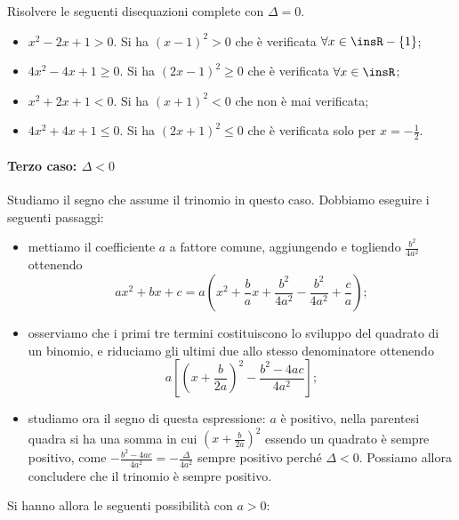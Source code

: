 \begin{exrig}
\begin{esempio}
Risolvere le seguenti disequazioni complete con $\Delta=0$.
\begin{itemize}
\item $x^2-2x+1>0$. Si ha $(x-1)^2>0$ che è verificata $\forall x\in \insR - \{1\}$;
\item $4x^2-4x+1\ge 0$. Si ha $(2x-1)^2\ge 0$ che è verificata $\forall x\in \insR$;
\item $x^2+2x+1<0$. Si ha $(x+1)^2<0$ che non è mai verificata;
\item $4x^2+4x+1\le 0$. Si ha $(2x+1)^2\le 0$ che è verificata solo per $x=-\frac 1 2$.
\end{itemize}
\end{esempio}
\end{exrig}

\paragraph{Terzo caso: $\Delta <0$} Studiamo il segno che assume il trinomio in questo caso. Dobbiamo eseguire i seguenti passaggi:

\begin{itemize}
\item mettiamo il coefficiente $a$ a fattore comune, aggiungendo e togliendo $\frac{b^2} {4a^2}$ ottenendo 
\[{ax}^2+{bx}+c=a\left(x^2+\frac b ax+\frac{b^2} {4a^2}-\frac{b^2} {4a^2}+\frac c a\right);\]
\item osserviamo che i primi tre termini costituiscono lo sviluppo del quadrato di un binomio, e riduciamo gli ultimi due allo stesso denominatore ottenendo 
\[a\left[\left(x+\frac b {2a}\right)^2-\frac{b^2-4{ac}} {4a^2}\right];\]
\item studiamo ora il segno di questa espressione: $a$ è positivo, nella parentesi quadra si ha una somma in cui $\left(x+\frac b {2a}\right)^2$ essendo un quadrato è sempre positivo, come $-\frac{b^2-4{ac}} {4a^2}=-\frac{\Delta } {4a^2}$ sempre positivo perché $\Delta <0$. Possiamo allora concludere che il trinomio è sempre positivo.
\end{itemize}
Si hanno allora le seguenti possibilità con $a>0$:

